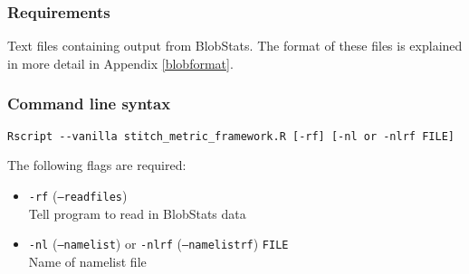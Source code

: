\documentclass{article}
\begin{document}
\subsubsection{Requirements}
Text files containing output from BlobStats. The format of these files is explained in more detail in Appendix \ref{blobformat}.

\subsubsection{Command line syntax}
\begin{verbatim}
Rscript --vanilla stitch_metric_framework.R [-rf] [-nl or -nlrf FILE]
\end{verbatim}

The following flags are required:
\begin{itemize}
\item[] \texttt{-rf} (\texttt{--readfiles}) \\ Tell program to read in BlobStats data
\item[]\texttt{-nl} (\texttt{--namelist}) or \texttt{-nlrf} (\texttt{--namelistrf}) \texttt{FILE}\\ Name of namelist file
\end{itemize}
\end{document}

